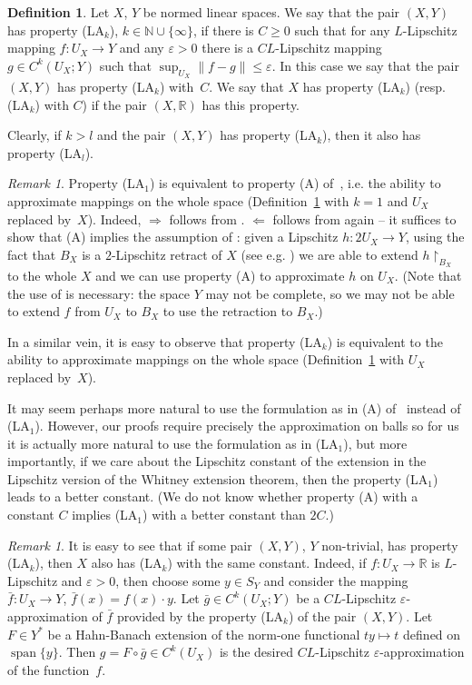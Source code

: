 \documentclass[a4paper,twoside,10pt,reqno,draft]{amsart}
\let\comp=\circ
\theoremstyle{definition}
\newtheorem{definition}[theorem]{Definition}
\theoremstyle{remark}
\newtheorem{remark}[theorem]{Remark}
\newcommand\norm[1]{\mathopen\|#1\mathclose\|}
\newcommand\ve{\varepsilon}
\newcommand\N{{\mathbb N}}
\newcommand\R{{\mathbb R}}
\newcommand\restr[1]{\mathclose\restriction_{#1}}
\DeclareMathOperator{\spn}{span}
\newcommand\pLA[1]{(LA$_#1$)}
\begin{document}
\begin{definition}\label{d:LA}
Let $X$, $Y$ be normed linear spaces.
We say that the pair $(X,Y)$ has property \pLA k, $k\in\N\cup\{\infty\}$, if
there is $C\ge0$ such that for any $L$-Lipschitz mapping $f\colon U_X\to Y$ and any $\ve>0$ there is a $CL$-Lipschitz mapping $g\in C^k(U_X;Y)$ such that $\sup_{U_X}\norm{f-g}\le\ve$.
In this case we say that the pair $(X,Y)$ has property \pLA k with~$C$.
We say that $X$ has property \pLA k (resp. \pLA k with $C$) if the pair $(X,\R)$ has this property.
\end{definition}

Clearly, if $k>l$ and the pair $(X,Y)$ has property \pLA k, then it also has property \pLA l.

\begin{remark}\label{r:LA1=A}
Property \pLA1 is equivalent to property (A) of~\cite{JS2}, i.e. the ability to approximate mappings on the whole space (Definition~\ref{d:LA} with $k=1$ and $U_X$ replaced by~$X$).
Indeed, $\Rightarrow$ follows from \cite[Theorem~7.86]{HJ}.
$\Leftarrow$ follows from \cite[Theorem~7.86]{HJ} again -- it suffices to show that (A) implies the assumption of \cite[Theorem~7.86]{HJ}:
given a Lipschitz $h\colon 2U_X\to Y$, using the fact that $B_X$ is a $2$-Lipschitz retract of $X$ (see e.g. \cite[Section~2]{F})
we are able to extend $h\restr{B_X}$ to the whole $X$ and we can use property (A) to approximate $h$ on $U_X$.
(Note that the use of \cite[Theorem~7.86]{HJ} is necessary: the space $Y$ may not be complete, so we may not be able to extend $f$ from $U_X$ to $B_X$ to use the retraction to $B_X$.)

In a similar vein, it is easy to observe that property \pLA k is equivalent to the ability to approximate mappings on the whole space (Definition~\ref{d:LA} with $U_X$ replaced by~$X$).
\end{remark}

It may seem perhaps more natural to use the formulation as in (A) of~\cite{JS2} instead of \pLA1.
However, our proofs require precisely the approximation on balls so for us it is actually more natural to use the formulation as in \pLA1,
but more importantly, if we care about the Lipschitz constant of the extension in the Lipschitz version of the Whitney extension theorem, then the property \pLA1 leads to a better constant.
(We do not know whether property (A) with a constant $C$ implies \pLA1 with a better constant than $2C$.)

\begin{remark}\label{r:LA_X}
It is easy to see that if some pair $(X,Y)$, $Y$ non-trivial, has property \pLA k, then $X$ also has \pLA k with the same constant.
Indeed, if $f\colon U_X\to\R$ is $L$-Lipschitz and $\ve>0$, then choose some $y\in S_Y$ and consider the mapping $\bar f\colon U_X\to Y$, $\bar f(x)=f(x)\cdot y$.
Let $\bar g\in C^k(U_X;Y)$ be a $CL$-Lipschitz $\ve$-approximation of $\bar f$ provided by the property \pLA k of the pair $(X,Y)$.
Let $F\in Y^*$ be a Hahn-Banach extension of the norm-one functional $ty\mapsto t$ defined on $\spn\{y\}$.
Then $g=F\comp\bar g\in C^k(U_X)$ is the desired $CL$-Lipschitz $\ve$-approximation of the function~$f$.
\end{remark}
\end{document}
